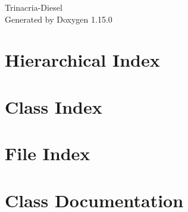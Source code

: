 \documentclass[twoside]{book}
\newcommand{\+}{\discretionary{\mbox{\scriptsize$\hookleftarrow$}}{}{}}
\newcommand{\clearemptydoublepage}{%
    \newpage{\pagestyle{empty}\cleardoublepage}%
  }
\begin{document}
  \raggedbottom
    \hypersetup{pageanchor=false,
                bookmarksnumbered=true,
                pdfencoding=unicode
               }
  \begin{titlepage}
  \vspace*{7cm}
  \begin{center}%
  {\Large Trinacria-\/\+Diesel}\\
  \vspace*{1cm}
  {\large Generated by Doxygen 1.15.0}\\
  \end{center}
  \end{titlepage}
  \clearemptydoublepage
  \tableofcontents
  \clearemptydoublepage
  \hypersetup{pageanchor=true}
\chapter{Hierarchical Index}

\chapter{Class Index}

\chapter{File Index}

\chapter{Class Documentation}































\end{document}
